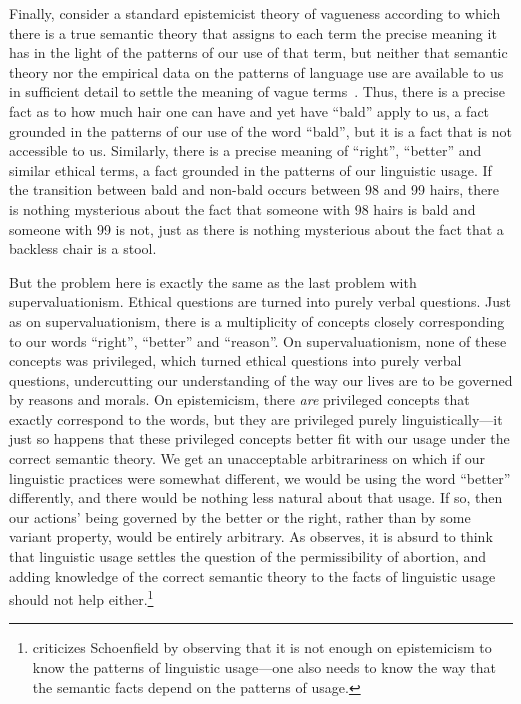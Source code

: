 Finally, consider a standard epistemicist theory of vagueness according to which there is a true semantic theory that assigns to each term the precise meaning it has in the
light of the patterns of our use of that term, but neither that semantic theory nor the empirical data on the patterns of language use are available
to us in sufficient detail to settle the meaning of vague terms~\cite[pp.~231--232]{WilliamsonVagueness}.  Thus, there is a precise fact as to how much hair one can have
and yet have ``bald'' apply to us, a fact grounded in the patterns of our use of the word ``bald'', but it is a fact that is not accessible to us. Similarly, there is
a precise meaning of ``right'', ``better'' and similar ethical terms, a fact grounded in the patterns of our linguistic usage. If the transition between bald and non-bald occurs
between 98 and 99 hairs, there is nothing mysterious about the fact that someone with 98 hairs is bald and someone with 99 is not, just as there is nothing mysterious
about the fact that a backless chair is a stool. 

But the problem here is exactly the same as the last problem with supervaluationism. Ethical questions are turned into purely verbal questions.
Just as on supervaluationism, there is a multiplicity of concepts closely corresponding to our words ``right'', ``better'' and ``reason''.
On supervaluationism, none of these concepts was privileged, which turned ethical questions into purely verbal questions, undercutting our understanding of the way  our lives are to be governed by reasons and morals. On epistemicism, there \textit{are} privileged concepts that exactly correspond to the
words, but they are privileged purely linguistically---it just so happens that these privileged concepts better fit with our usage under the
correct semantic theory. We get an unacceptable arbitrariness on which if our linguistic practices were somewhat different, we would be using the 
word ``better'' differently, and there would be nothing less natural about that usage. If so, then our actions' being governed by the better 
or the right, rather than by some variant property, would be entirely arbitrary. As  observes, it is absurd
to think that linguistic usage settles the question of the permissibility of abortion, and adding knowledge of
the correct semantic theory to the facts of linguistic usage should not help either.\footnote{ criticizes Schoenfield by observing that it is not enough on epistemicism to know the patterns of linguistic usage---one
also needs to know the way that the semantic facts depend on the patterns of usage.} 

